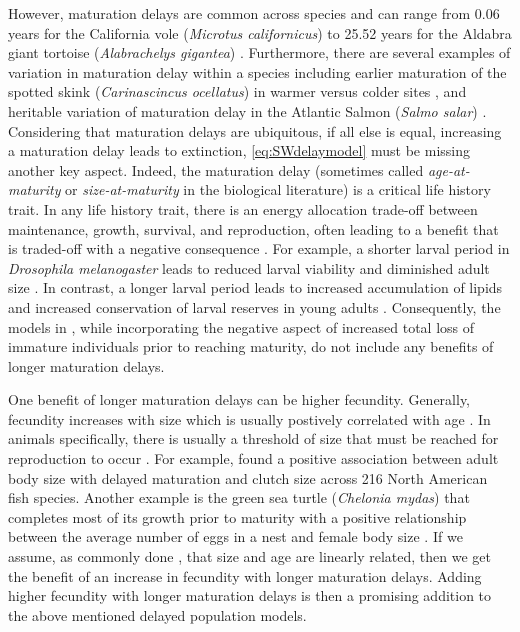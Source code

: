 \documentclass{article}
\numberwithin{theorem}{section}
\begin{document}
However, maturation delays are common across species and can range from 0.06 years for the California vole (\textit{Microtus californicus}) to 25.52 years for the Aldabra giant tortoise (\textit{Alabrachelys gigantea}) \cite{buddUniversalPredictionVertebrate}. Furthermore, there are several examples of variation in maturation delay within a species including earlier maturation of the spotted skink (\textit{Carinascincus ocellatus}) in warmer versus colder sites \cite{augertPlasticityAgeMaturity1993}, and heritable variation of maturation delay in the Atlantic Salmon (\textit{Salmo salar}) \cite{raunsgardVariationPhenotypicPlasticity2024}. Considering that maturation delays are ubiquitous, if all else is equal, increasing a maturation delay leads to extinction, \eqref{eq:SWdelaymodel} must be missing another key aspect. Indeed, the maturation delay (sometimes called {\it age-at-maturity} or {\it size-at-maturity} in the biological literature) is a critical life history trait. In any life history trait, there is an energy allocation trade-off between maintenance, growth, survival, and reproduction, often leading to a benefit that is  traded-off with a negative consequence \cite{zeraPhysiologyLifeHistory2001a}. For example, a shorter larval period in \textit{Drosophila melanogaster} leads to reduced larval viability and diminished adult size \cite{chippindaleExperimentalEvolutionAccelerated1997}. 
In contrast, a longer larval period leads to increased accumulation of lipids and increased conservation of larval reserves in young adults \cite{chippindaleExperimentalEvolutionAccelerated1997}. Consequently, the models in \cite{StWodelay2, StWodelay3}, while incorporating the negative aspect of increased total loss of immature individuals prior to reaching maturity, do not include any benefits of  longer maturation delays.

One benefit of longer maturation delays can be higher fecundity. Generally, fecundity increases with size which is usually postively correlated with age \cite{roff2002life}. In animals specifically, there is usually a threshold of size that must be reached for reproduction to occur \cite{reesGrowthReproductionPopulation1989}. For example, \cite{winemillerPatternsLifehistoryDiversification1992} found a positive association between adult body size with delayed maturation and clutch size across 216 North American fish species. Another example is the green sea turtle (\textit{Chelonia mydas}) that completes most of its growth prior to maturity with a positive relationship between the average number of eggs in a nest and female body size \cite{Phillips2021, Frazer86, Carr89}. If we assume, as commonly done \cite{Spence2017, vonB2}, that size and age are linearly related, then we get the benefit of an increase in fecundity with longer maturation delays. Adding higher fecundity with longer maturation delays is then a promising addition to the above mentioned delayed population models.
\end{document}
